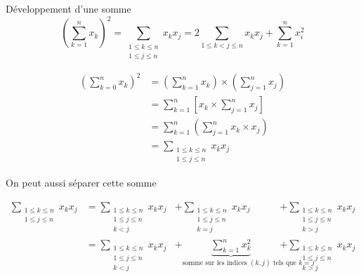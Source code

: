 \documentclass{article}
\begin{document}
\begin{question_kholle}[
    {$$\left( \sum_{k=1}^{n}x_{k} \right)^{2} = \sum_{\substack{1\leqslant k \leqslant n\\ 1 \leqslant j \leqslant n}} x_{k}x_{j} = 2 \sum_{1\leqslant k < j \leqslant n} x_{k}x_{j}+\sum_{k=1}^{n}x_{i}^{2}$$}
    ]{Développement d'une somme}
    $$
    \left( \sum_{k=1}^{n}x_{k} \right)^{2} = \sum_{\substack{1\leqslant k \leqslant n\\ 1 \leqslant j \leqslant n}} x_{k}x_{j} = 2 \sum_{1\leqslant k < j \leqslant n} x_{k}x_{j}+\sum_{k=1}^{n}x_{i}^{2}
    $$
    
    
    \begin{align*}
        \left( \sum_{k=0}^{n}x_{k} \right)^{2}
        &= \left( \sum_{k=1}^{n} x_{k} \right) \times \left( \sum_{j=1}^{n} x_{j} \right) \\
        &= \sum_{k=1}^{n}\left[ x_{k} \times \sum_{j=1}^{n}x_{j} \right] \\
        &= \sum_{k=1}^{n}\left( \sum_{j=1}^{n} x_{k}\times x_{j} \right) \\
        &= \sum_{\substack{1\leqslant k \leqslant n\\ 1 \leqslant j \leqslant n}} x_{k}x_{j}
    \end{align*}
    
    
    On peut aussi séparer cette somme
    
    \begin{align*}
        \sum_{\substack{1\leqslant k \leqslant n\\ 1 \leqslant j \leqslant n}} x_{k}x_{j}
        &=
        \sum_{\substack{1\leqslant k \leqslant n\\ 1 \leqslant j \leqslant n \\ k<j}} x_{k}x_{j} &+
        \sum_{\substack{1\leqslant k \leqslant n\\ 1 \leqslant j \leqslant n\\k=j}} x_{k}x_{j} &+
        \sum_{\substack{1\leqslant k \leqslant n\\ 1 \leqslant j \leqslant n\\k>j}} x_{k}x_{j}\\
        &=
        \sum_{\substack{1\leqslant k \leqslant n\\ 1 \leqslant j \leqslant n \\ k<j}} x_{k}x_{j} & +
        \underbrace{ \sum_{k=1}^{n}x_{k}^{2} }_{ \text{somme sur les indices }(k,j) \text{ tels que } k = j } &+
        \sum_{\substack{1\leqslant k \leqslant n\\ 1 \leqslant j \leqslant n\\k>j}} x_{k}x_{j}
    \end{align*}
    

\end{question_kholle}
\end{document}
